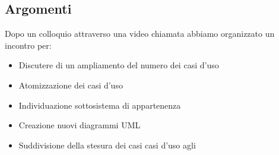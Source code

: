         \subsection{Argomenti}
            Dopo un colloquio attraverso una video chiamata  abbiamo organizzato un incontro per:
            \begin{itemize}
                \item Discutere di un ampliamento del numero dei casi d'uso
                \item Atomizzazione dei casi d'uso
                \item Individuazione sottosistema di appartenenza
                \item Creazione nuovi diagrammi UML
                \item Suddivisione della stesura dei casi casi d'uso agli \Anas 
            \end{itemize}

